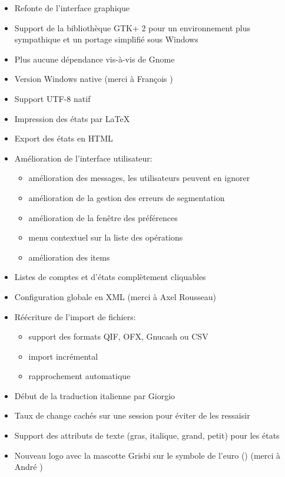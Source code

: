 \begin{itemize}
	\item Refonte de l'interface graphique
	\item Support de la bibliothèque \gls{GTK}+ 2 pour un environnement plus sympathique et un portage simplifié sous Windows
	\item Plus aucune dépendance vis-à-vis de \gls{Gnome}
	\item Version Windows native (merci à François )%
	\item Support \gls{UTF-8} natif
	\item Impression des états par \gls{LaTeX}
	\item Export des états en \gls{HTML}
	\item Amélioration de l'interface utilisateur:
		\begin{itemize}
		\item amélioration des messages, les utilisateurs peuvent en ignorer
		\item amélioration de la gestion des erreurs de segmentation
		\item amélioration de la fenêtre des préférences
		\item menu contextuel sur la liste des opérations
		\item amélioration des items
		\end{itemize}
	\item Listes de comptes et d'états complètement cliquables
	\item Configuration globale en \gls{XML} (merci à Axel Rousseau)
	\item Réécriture de l'import de fichiers:
		\begin{itemize}
		\item support des formats \gls{QIF}, \gls{OFX}, \gls{Gnucash} ou \gls{CSV}
		\item import incrémental
		\item rapprochement automatique
		\end{itemize}
	\item Début de la traduction italienne par Giorgio 
	\item Taux de change cachés sur une session pour éviter de les ressaisir
	\item Support des attributs de texte (gras, italique, grand, petit) pour les états
	\item Nouveau logo avec la mascotte Grisbi sur le symbole de l'euro (\texteuro) (merci à André )

\end{itemize}

